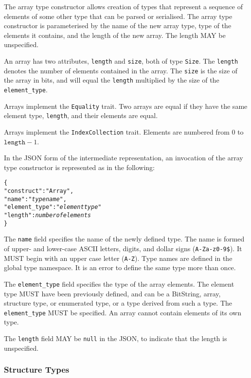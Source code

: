 \documentclass[10pt,twocolumn,a4paper]{article}
\newcommand{\code}[1]{\texttt{#1}}
\begin{document}
The array type constructor allows creation of types that represent a
sequence of elements of some other type that can be parsed or serialised.
The array type constructor is parameterised by the name of the new array
type, type of the elements it contains, and the length of the new array.
The length MAY be unspecified. 

An array has two attributes, \code{length} and \code{size}, both of type
\code{Size}. The \code{length} denotes the number of elements contained
in the array. The \code{size} is the size of the array in bits, and will
equal the \code{length} multiplied by the size of the \code{element\_type}.

Arrays implement the \code{Equality} trait. Two arrays are equal if they
have the same element type, \code{length}, and their elements are equal.

Arrays implement the \code{IndexCollection} trait. Elements are numbered from $0$ to
$\code{length}-1$.

In the JSON form of the intermediate representation, an invocation of the
array type constructor is represented as in the following:
\footnotesize
\begin{alltt}
  \{
    "construct"    : "Array",
    "name"         : "\emph{type name}",
    "element\_type" : "\emph{element type}"
    "length"       : \emph{number of elements}
  \}
\end{alltt}
\normalsize
The \code{name} field specifies the name of the newly defined type. The
name is formed of upper- and lower-case ASCII letters, digits, and dollar
signs (\code{A-Za-z0-9\$}).  It MUST begin with an upper case letter
(\code{A-Z}). Type names are defined in the global type namespace.
It is an error to define the same type more than once.

The \code{element\_type} field specifies the type of the array elements.
The element type MUST have been previously defined, and can be a BitString,
array, structure type, or enumerated type, or a type derived from such a
type. The \code{element\_type} MUST be specified.
An array cannot contain elements of its own type.

The \code{length} field MAY be \code{null} in the JSON, to indicate that
the length is unspecified.

\subsubsection{Structure Types}
\end{document}
